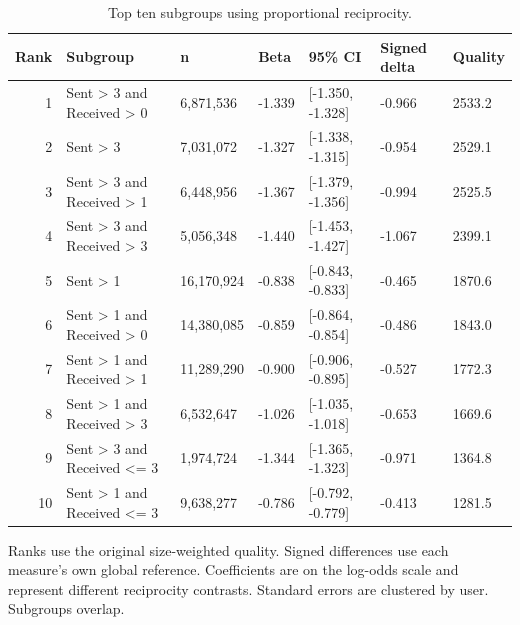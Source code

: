 \begin{table}[t]
\centering
\small
\setlength{\tabcolsep}{3pt}
\caption{Top ten subgroups using proportional reciprocity.}
\begin{tabular}{rllllll}
\toprule
Rank & Subgroup & n & Beta & 95\% CI & Signed delta & Quality \\
\midrule
1 & Sent > 3 and Received > 0 & 6,871,536 & -1.339 & [-1.350, -1.328] & -0.966 & 2533.2 \\
2 & Sent > 3 & 7,031,072 & -1.327 & [-1.338, -1.315] & -0.954 & 2529.1 \\
3 & Sent > 3 and Received > 1 & 6,448,956 & -1.367 & [-1.379, -1.356] & -0.994 & 2525.5 \\
4 & Sent > 3 and Received > 3 & 5,056,348 & -1.440 & [-1.453, -1.427] & -1.067 & 2399.1 \\
5 & Sent > 1 & 16,170,924 & -0.838 & [-0.843, -0.833] & -0.465 & 1870.6 \\
6 & Sent > 1 and Received > 0 & 14,380,085 & -0.859 & [-0.864, -0.854] & -0.486 & 1843.0 \\
7 & Sent > 1 and Received > 1 & 11,289,290 & -0.900 & [-0.906, -0.895] & -0.527 & 1772.3 \\
8 & Sent > 1 and Received > 3 & 6,532,647 & -1.026 & [-1.035, -1.018] & -0.653 & 1669.6 \\
9 & Sent > 3 and Received <= 3 & 1,974,724 & -1.344 & [-1.365, -1.323] & -0.971 & 1364.8 \\
10 & Sent > 1 and Received <= 3 & 9,638,277 & -0.786 & [-0.792, -0.779] & -0.413 & 1281.5 \\
\bottomrule
\end{tabular}
\begin{minipage}{\textwidth}
\footnotesize
Ranks use the original size-weighted quality. Signed differences use each measure's own global reference. Coefficients are on the log-odds scale and represent different reciprocity contrasts. Standard errors are clustered by user. Subgroups overlap.
\end{minipage}
\end{table}
